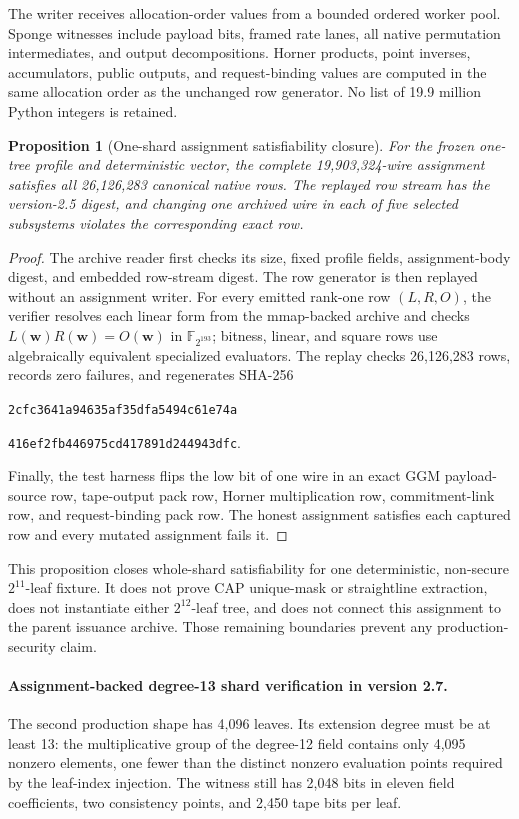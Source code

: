 \documentclass[11pt]{article}
\newtheorem{proposition}[definition]{Proposition}
\begin{document}
The writer receives allocation-order values from a bounded ordered worker
pool.  Sponge witnesses include payload bits, framed rate lanes, all native
permutation intermediates, and output decompositions.  Horner products,
point inverses, accumulators, public outputs, and request-binding values are
computed in the same allocation order as the unchanged row generator.  No
list of 19.9 million Python integers is retained.

\begin{proposition}[One-shard assignment satisfiability closure]
For the frozen one-tree profile and deterministic vector, the complete
19,903,324-wire assignment satisfies all 26,126,283 canonical native rows.
The replayed row stream has the version-2.5 digest, and changing one archived
wire in each of five selected subsystems violates the corresponding exact row.
\end{proposition}
\begin{proof}
The archive reader first checks its size, fixed profile fields, assignment-body
digest, and embedded row-stream digest.  The row generator is then replayed
without an assignment writer.  For every emitted rank-one row $(L,R,O)$, the
verifier resolves each linear form from the mmap-backed archive and checks
$L(\mathbf w)R(\mathbf w)=O(\mathbf w)$ in $\mathbb F_{2^{193}}$; bitness,
linear, and square rows use algebraically equivalent specialized evaluators.
The replay checks 26,126,283 rows, records zero failures, and regenerates
SHA-256
\begin{center}
\texttt{2cfc3641a94635af35dfa5494c61e74a}\par\vspace{-0.2em}
\texttt{416ef2fb446975cd417891d244943dfc}.
\end{center}
Finally, the test harness flips the low bit of one wire in an exact GGM
payload-source row, tape-output pack row, Horner multiplication row,
commitment-link row, and request-binding pack row.  The honest assignment
satisfies each captured row and every mutated assignment fails it.
\end{proof}

This proposition closes whole-shard satisfiability for one deterministic,
non-secure $2^{11}$-leaf fixture.  It does not prove CAP unique-mask or
straightline extraction, does not instantiate either $2^{12}$-leaf tree, and
does not connect this assignment to the parent issuance archive.  Those
remaining boundaries prevent any production-security claim.

\paragraph{Assignment-backed degree-13 shard verification in version 2.7.}
The second production shape has 4,096 leaves.  Its extension degree must be at
least 13: the multiplicative group of the degree-12 field contains only 4,095
nonzero elements, one fewer than the distinct nonzero evaluation points
required by the leaf-index injection.  The witness still has 2,048 bits in
eleven field coefficients, two consistency points, and 2,450 tape bits per
leaf.
\end{document}
